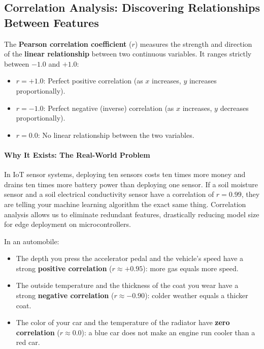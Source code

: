 \subsection{Correlation Analysis: Discovering Relationships Between Features}

\begin{keyidea}
The \textbf{Pearson correlation coefficient} ($r$) measures the strength and direction of the \textbf{linear relationship} between two continuous variables. It ranges strictly between $-1.0$ and $+1.0$:
\begin{itemize}
    \item $r = +1.0$: Perfect positive correlation (as $x$ increases, $y$ increases proportionally).
    \item $r = -1.0$: Perfect negative (inverse) correlation (as $x$ increases, $y$ decreases proportionally).
    \item $r = 0.0$: No linear relationship between the two variables.
\end{itemize}
\end{keyidea}

\paragraph{Why It Exists: The Real-World Problem}
In IoT sensor systems, deploying ten sensors costs ten times more money and drains ten times more battery power than deploying one sensor. If a soil moisture sensor and a soil electrical conductivity sensor have a correlation of $r = 0.99$, they are telling your machine learning algorithm the exact same thing. Correlation analysis allows us to eliminate redundant features, drastically reducing model size for edge deployment on microcontrollers.

\begin{analogy}
In an automobile:
\begin{itemize}
    \item The depth you press the accelerator pedal and the vehicle's speed have a strong \textbf{positive correlation} ($r \approx +0.95$): more gas equals more speed.
    \item The outside temperature and the thickness of the coat you wear have a strong \textbf{negative correlation} ($r \approx -0.90$): colder weather equals a thicker coat.
    \item The color of your car and the temperature of the radiator have \textbf{zero correlation} ($r \approx 0.0$): a blue car does not make an engine run cooler than a red car.
\end{itemize}
\end{analogy}

